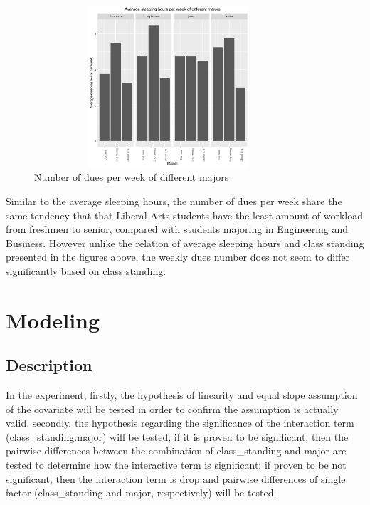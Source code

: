 \documentclass{article} %
\begin{document}
\begin{figure}[H]
	\begin{center}
		\includegraphics[height=6cm, width=10cm]{4.png}
	\end{center}
	\caption{Number of dues per week of different majors}
\end{figure}




Similar to the average sleeping hours, the number of dues per week share the same tendency that that Liberal Arts students have the least amount of workload from freshmen to senior, compared with students majoring in Engineering and Business. However unlike the relation of average sleeping hours and class standing presented in the figures above, the weekly dues number does not seem to differ significantly based on class standing.  

\section{Modeling}


\subsection{Description}

In the experiment, firstly, the hypothesis of linearity and equal slope assumption of the covariate will be tested in order to confirm the assumption is actually valid. secondly, the hypothesis regarding the significance of the interaction term (class\_standing:major) will be tested, if it is proven to be significant, then the pairwise differences between the combination of class\_standing and major are tested to determine how the interactive term is significant; if proven to be not significant, then the interaction term is drop and pairwise differences of single factor (class\_standing and major, respectively) will be tested.
\end{document}
